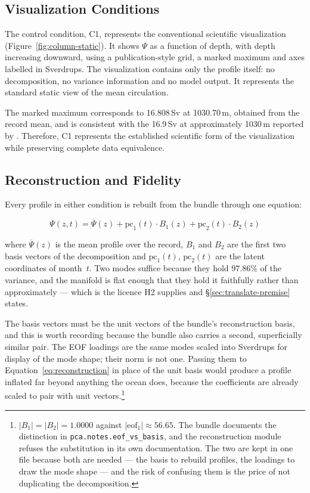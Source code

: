 \subsection{Visualization Conditions}
\label{subsec:column-conditions}

The control condition, C1, represents the conventional scientific visualization (Figure~\ref{fig:column-static}). It shows $\Psi$ as a function of depth, with depth increasing downward, using a publication-style grid, a marked maximum and axes labelled in Sverdrups. The visualization contains only the profile itself: no decomposition, no variance information and no model output. It represents the standard static view of the mean circulation.

 The marked maximum corresponds to 16.808\,Sv at 1030.70\,m, obtained from the record mean, and is consistent with the 16.9\,Sv at approximately 1030\,m reported by \textcite{smeed2018}. Therefore, C1 represents the established scientific form of the visualization while preserving complete data equivalence.


\subsection{Reconstruction and Fidelity}
\label{subsec:column-reconstruction}

Every profile in either condition is rebuilt from the bundle through one equation:

\begin{equation}
\label{eq:reconstruction}
\Psi(z, t) = \overline{\Psi}(z) + \mathrm{pc}_1(t) \cdot B_1(z) + \mathrm{pc}_2(t) \cdot B_2(z)
\end{equation}

where $\overline{\Psi}(z)$ is the mean profile over the record, $B_1$ and $B_2$ are the first two basis vectors of the decomposition and $\mathrm{pc}_1(t)$, $\mathrm{pc}_2(t)$ are the latent coordinates of month~$t$. Two modes suffice because they hold $97.86\%$ of the variance, and the manifold is flat enough that they hold it faithfully rather than approximately --- which is the licence H2 supplies and \S\ref{sec:translate-premise} states.

The basis vectors must be the unit vectors of the bundle's reconstruction basis, and this is worth recording because the bundle also carries a second, superficially similar pair. The EOF loadings are the same modes scaled into Sverdrups for display of the mode shape; their norm is not one. Passing them to Equation~\ref{eq:reconstruction} in place of the unit basis would produce a profile inflated far beyond anything the ocean does, because the coefficients are already scaled to pair with unit vectors.\footnote{$|B_1| = |B_2| = 1.0000$ against $|\text{eof}_1| \approx 56.65$. The bundle documents the distinction in \texttt{pca.notes.eof\_vs\_basis}, and the reconstruction module refuses the substitution in its own documentation. The two are kept in one file because both are needed --- the basis to rebuild profiles, the loadings to draw the mode shape --- and the risk of confusing them is the price of not duplicating the decomposition.}

